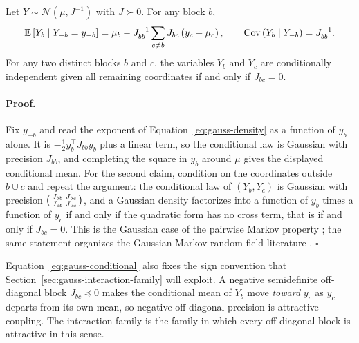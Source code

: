 Let $Y\sim\mathcal N(\mu,J^{-1})$ with $J\succ0$. For any block $b$,
\begin{equation}
\mathbb E\left[Y_b\mid Y_{-b}=y_{-b}\right]
=\mu_b-J_{bb}^{-1}\sum_{c\neq b}J_{bc}\left(y_c-\mu_c\right),
\qquad
\operatorname{Cov}\left(Y_b\mid Y_{-b}\right)=J_{bb}^{-1}.
\label{eq:gauss-conditional}
\end{equation}
For any two distinct blocks $b$ and $c$, the variables $Y_b$ and $Y_c$ are conditionally independent given all remaining coordinates if and only if $J_{bc}=0$. 

\paragraph{Proof.}
Fix $y_{-b}$ and read the exponent of Equation~\eqref{eq:gauss-density} as a function of $y_b$ alone. It is $-\tfrac12y_b^\top J_{bb}y_b$ plus a linear term, so the conditional law is Gaussian with precision $J_{bb}$, and completing the square in $y_b$ around $\mu$ gives the displayed conditional mean. For the second claim, condition on the coordinates outside $b\cup c$ and repeat the argument: the conditional law of $(Y_b,Y_c)$ is Gaussian with precision $\begin{psmallmatrix}J_{bb}&J_{bc}\\J_{cb}&J_{cc}\end{psmallmatrix}$, and a Gaussian density factorizes into a function of $y_b$ times a function of $y_c$ if and only if the quadratic form has no cross term, that is if and only if $J_{bc}=0$. This is the Gaussian case of the pairwise Markov property \citep[Ch.~5]{Lauritzen1996}; the same statement organizes the Gaussian Markov random field literature \citep[Ch.~2]{RueHeld2005}. $\square$

Equation~\eqref{eq:gauss-conditional} also fixes the sign convention that Section~\ref{sec:gauss-interaction-family} will exploit. A negative semidefinite off-diagonal block $J_{bc}\preceq0$ makes the conditional mean of $Y_b$ move \emph{toward} $y_c$ as $y_c$ departs from its own mean, so negative off-diagonal precision is attractive coupling. The interaction family is the family in which every off-diagonal block is attractive in this sense.


